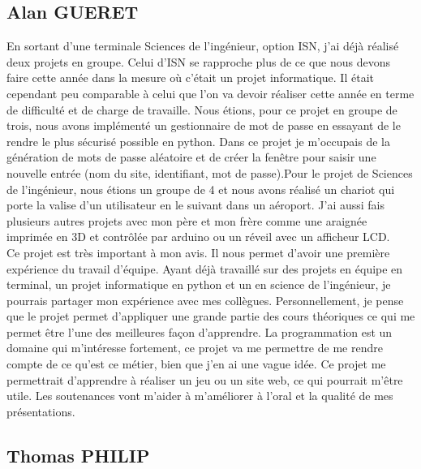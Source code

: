 \documentclass[12pt]{report}
\begin{document}
		\subsection{Alan GUERET}
			En sortant d'une terminale Sciences de l'ingénieur, option ISN, j'ai déjà réalisé deux projets en groupe. Celui d'ISN se rapproche plus de ce que nous devons faire cette année dans la mesure où c'était un projet informatique. Il était cependant peu comparable à celui que l'on va devoir réaliser cette année en terme de difficulté et de charge de travaille. Nous étions, pour ce projet en groupe de trois, nous avons implémenté un gestionnaire de mot de passe en essayant de le rendre le plus sécurisé possible en python. Dans ce projet je m'occupais de la génération de mots de passe aléatoire et de créer la fenêtre pour saisir une nouvelle entrée (nom du site, identifiant, mot de passe).Pour le projet de Sciences de l'ingénieur, nous étions un groupe de 4 et nous avons réalisé un chariot qui porte la valise d'un utilisateur en le suivant dans un aéroport. J'ai aussi fais plusieurs autres projets avec mon père et mon frère comme une araignée imprimée en 3D et contrôlée par arduino ou un réveil avec un afficheur LCD.\\

Ce projet est très important à mon avis. Il nous permet d'avoir une première expérience du travail d'équipe. Ayant déjà travaillé sur des projets en équipe en terminal, un projet
informatique en python et un en science de l'ingénieur, je pourrais partager mon expérience avec mes collègues. Personnellement, je pense que le projet permet d'appliquer une grande partie des cours théoriques ce qui me permet être l'une des meilleures façon d'apprendre. La programmation est un domaine qui m'intéresse fortement, ce projet va me permettre de me rendre compte de ce qu'est ce métier, bien que j'en ai une vague idée. Ce projet me permettrait d'apprendre à réaliser un jeu ou un site web, ce qui pourrait m'être utile. Les soutenances vont m'aider à m'améliorer à l'oral et la qualité de mes présentations. 

		
		\subsection{Thomas PHILIP}
\end{document}
